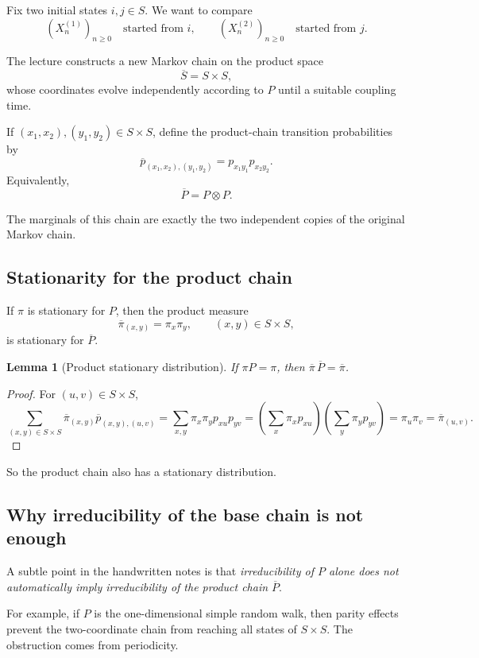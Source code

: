 \documentclass[11pt]{article}
\newtheorem{lemma}[theorem]{Lemma}
\theoremstyle{definition}
\begin{document}
Fix two initial states \(i,j\in S\). We want to compare
\[
(X_n^{(1)})_{n\ge 0}\quad\text{started from }i,
\qquad
(X_n^{(2)})_{n\ge 0}\quad\text{started from }j.
\]

The lecture constructs a new Markov chain on the product space
\[
\overline S = S\times S,
\]
whose coordinates evolve independently according to \(P\) until a suitable coupling time.

If \((x_1,x_2),(y_1,y_2)\in S\times S\), define the product-chain transition probabilities by
\[
\overline p_{(x_1,x_2),(y_1,y_2)}
=
 p_{x_1y_1}p_{x_2y_2}.
\]
Equivalently,
\[
\overline P = P\otimes P.
\]

The marginals of this chain are exactly the two independent copies of the original Markov chain.

\subsection{Stationarity for the product chain}

If \(\pi\) is stationary for \(P\), then the product measure
\[
\overline\pi_{(x,y)} = \pi_x\pi_y,
\qquad (x,y)\in S\times S,
\]
is stationary for \(\overline P\).

\begin{lemma}[Product stationary distribution]
If \(\pi P=\pi\), then \(\overline\pi\,\overline P=\overline\pi\).
\end{lemma}

\begin{proof}
For \((u,v)\in S\times S\),
\[
\sum_{(x,y)\in S\times S}\overline\pi_{(x,y)}\overline p_{(x,y),(u,v)}
=
\sum_{x,y}\pi_x\pi_y p_{xu}p_{yv}
=
\left(\sum_x \pi_x p_{xu}\right)
\left(\sum_y \pi_y p_{yv}\right)
=
\pi_u\pi_v
=
\overline\pi_{(u,v)}.
\]
\end{proof}

So the product chain also has a stationary distribution.

\subsection{Why irreducibility of the base chain is not enough}

A subtle point in the handwritten notes is that \emph{irreducibility of \(P\) alone does not automatically imply irreducibility of the product chain \(\overline P\)}.

For example, if \(P\) is the one-dimensional simple random walk, then parity effects prevent the two-coordinate chain from reaching all states of \(S\times S\). The obstruction comes from periodicity.
\end{document}
